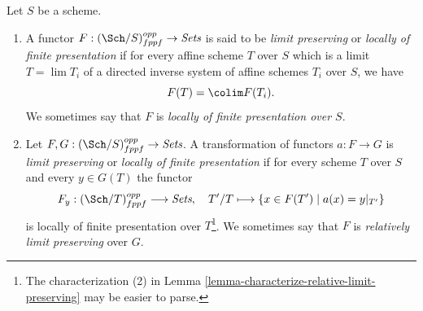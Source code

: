 \begin{definition}
\label{definition-locally-finite-presentation}
Let $S$ be a scheme.
\begin{enumerate}
\item A functor $F : (\Sch/S)_{fppf}^{opp} \to \textit{Sets}$
is said to be {\it limit preserving} or {\it locally of finite presentation} if
for every affine scheme $T$ over $S$ which is a limit $T = \lim T_i$
of a directed inverse system of affine schemes $T_i$ over $S$, we have
$$
F(T) = \colim F(T_i).
$$
We sometimes say that $F$ is {\it locally of finite presentation over $S$}.
\item Let $F, G : (\Sch/S)_{fppf}^{opp} \to \textit{Sets}$.
A transformation of functors $a : F \to G$
is {\it limit preserving} or {\it locally of finite presentation}
if for every scheme $T$ over $S$ and every $y \in G(T)$ the functor
$$
F_y : (\Sch/T)_{fppf}^{opp} \longrightarrow \textit{Sets}, \quad
T'/T \longmapsto \{x \in F(T') \mid a(x) = y|_{T'}\}
$$
is locally of finite presentation over $T$\footnote{The characterization (2) in
Lemma \ref{lemma-characterize-relative-limit-preserving}
may be easier to parse.}. We sometimes say that
$F$ is {\it relatively limit preserving} over $G$.
\end{enumerate}
\end{definition}
